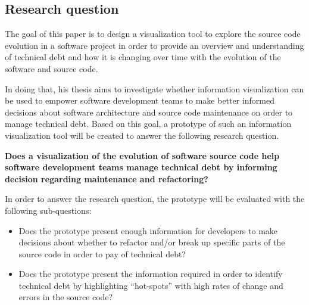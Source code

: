 \subsection{Research question}
The goal of this paper is to design a visualization tool to explore the source code evolution in a software project in order to provide an overview and understanding of technical debt and how it is changing over time with the evolution of the software and source code. 

In doing that, his thesis aims to investigate whether information visualization can be used to empower software development teams to make better informed decisions about software architecture and source code maintenance on order to manage technical debt. Based on this goal, a prototype of such an information visualization tool will be created to answer the following research question.


\smallskip
\textbf{
Does a visualization of the evolution of software source code help software development teams manage technical debt by informing decision regarding maintenance and refactoring?
}
\smallskip

In order to answer the research question, the prototype will be evaluated with the following sub-questions:
\begin{itemize}
\item Does the prototype present enough information for developers to make decisions about whether to refactor and/or break up specific parts of the source code in order to pay of technical debt?
\item Does the prototype present the information required in order to identify technical debt by highlighting “hot-spots” with high rates of change and errors in the source code?
\end{itemize}